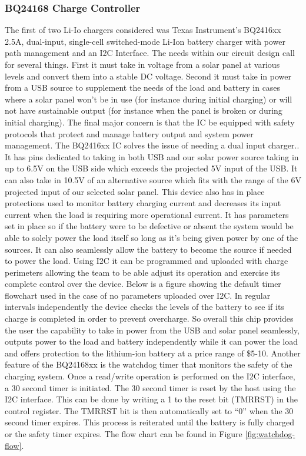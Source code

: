 \subsubsection{BQ24168 Charge Controller}
The first of two Li-Io chargers considered was Texas Instrument's BQ2416xx 2.5A, dual-input, single-cell switched-mode Li-Ion battery charger with power path management and an I2C Interface. The needs within our circuit design call for several things. First it must take in voltage from a solar panel at various levels and convert them into a stable DC voltage. Second it must take in power from a USB source to supplement the needs of the load and battery in cases where a solar panel won't be in use (for instance during initial charging) or will not have sustainable output (for instance when the panel is broken or during initial charging). The final major concern is that the IC be equipped with safety protocols that protect and manage battery output and system power management. The BQ2416xx IC solves the issue of needing a dual input charger.. It has pins dedicated to taking in both USB and our solar power source taking in up to 6.5V on the USB side which exceeds the projected 5V input of the USB. It can also take in 10.5V of an alternative source which fits with the range of the 6V projected input of our selected solar panel. This device also has in place protections used to monitor battery charging current and decreases its input current when the load is requiring more operational current. It has parameters set in place so if the battery were to be defective or absent the system would be able to solely power the load itself so long as it's being given power by one of the sources. It can also seamlessly allow the battery to become the source if needed to power the load. Using I2C it can be programmed and uploaded with charge perimeters allowing the team to be able adjust its operation and exercise its complete control over the device. Below is a figure showing the default timer flowchart used in the case of no parameters uploaded over I2C. In regular intervals independently the device checks the levels of the battery to see if its charge is completed in order to prevent overcharge. So overall this chip provides the user the capability to take in power from the USB and solar panel seamlessly, outputs power to the load and battery independently while it can power the load and offers protection to the lithium-ion battery at a price range of \$5-10. Another feature of the BQ24168xx is the watchdog timer that monitors the safety of the charging system. Once a read/write operation is performed on the I2C interface, a 30 second timer is initiated. The
30 second timer is reset by the host using the I2C interface. This can be done by writing a 1 to the reset bit (TMRRST) in the control register. The TMRRST bit is then automatically set to “0” when the 30 second timer expires. This process is reiterated until the battery is fully charged or the safety timer expires. The flow chart can be found in Figure \ref{fig:watchdog-flow}.

